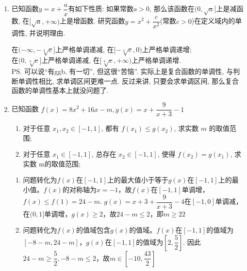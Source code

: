 \begin{enumerate}
\begin{jieda}
\begin{enumerate}
\item $f(x)=a(x-1)(x-3)-2x=ax^2-(4a+2)x+3a$, \\
于是$\Delta>0\land a<0$, 解得$a\in(-\infty,-2-\sqrt{3})\cup(-2+\sqrt{3},0)$. 
\end{enumerate}
\ps 别忘了$a<0$. 心中有图, 过程唾手可得. 
\end{jieda}
\begin{vspace_}
\vsp[5]
\end{vspace_}


\item 已知函数$y=x+\dfrac{a}{x}$有如下性质: 如果常数$a>0$, 那么该函数在$(0,\sqrt{a}]$上是减函数, 在$[\sqrt{a},+\infty)$上是增函数. 
研究函数$y=x^2+\dfrac{c}{x^2}$(常数$c>0$)在定义域内的单调性, 并说明理由.

\begin{jieda}
在$(-\infty,-\sqrt[4]{c}]$上严格单调递减, 在$[-\sqrt[4]{c},0)$上严格单调递增; \\
在$(0,\sqrt[4]{c}]$上严格单调递减, 在$[\sqrt[4]{c},+\infty)$上严格单调递增. \\
\ps 可以说``有ggb, 有一切'', 但这很``苦恼''. 实际上是复合函数的单调性, 与判断单调性相比, 求单调区间更难一点. 反过来讲, 只要会求单调区间, 那么复合函数的单调性基本上就没问题了. 
\end{jieda}
\begin{vspace_}
\vsp[5]
\end{vspace_}


\item 已知函数 $f(x)=8 x^2+16 x-m, g(x)=x+\dfrac{9}{x+3}-1$
\begin{enumerate}
    \item 对于任意 $x_1, x_2 \in[-1,1]$, 都有 $f\left(x_1\right) \leq g\left(x_2\right)$, 求实数 $m$ 的取值范围;
    \item 对于任意 $x_1 \in[-1,1]$, 总存在 $x_2 \in[-1,1]$, 使得 $f\left(x_2\right)=g\left(x_1\right)$, 求实数 m的取值范围;
\end{enumerate}
\begin{jieda}
    \begin{enumerate}
        \item 问题转化为$f(x)$在$[-1, 1]$上的最大值小于等于$g(x)$在$[-1, 1]$上的最小值。$f(x)$的对称轴为$x = -1$，故$f(x)$在$[-1, 1]$单调增，$f(x) \leq f(1) = 24-m$. $g(x) = x+3 + \dfrac{9}{x+3} - 4$在$[-1, 0]$单调减，在$(0, 1]$单调增，$g(x) \geq 2$，故$24-m \leq 2$，即$m \geq 22$
        \item 问题转化为$f(x)$的值域包含$g(x)$的值域。$f(x)$在$[-1, 1]$的值域为$[-8-m,24-m]$，$g(x)$在$[-1, 1]$的值域为$[2, \dfrac{5}{2}]$. 因此$24-m \geq \dfrac{5}{2}, -8-m \leq 2$，故$m \in [-10, \dfrac{43}{2}]$
    \end{enumerate}
\end{jieda}
\begin{vspace_}
\vsp[5]
\end{vspace_}


\end{enumerate}
